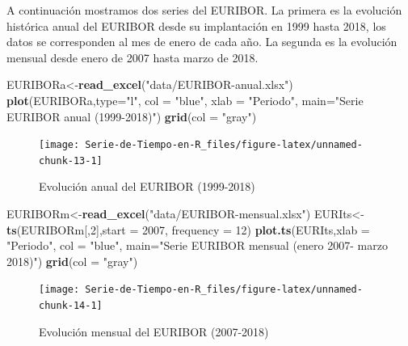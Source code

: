 \documentclass[12pt,]{krantz}
\makeatletter
\newenvironment{Shaded}{\begin{snugshade}}{\end{snugshade}}
\newcommand{\KeywordTok}[1]{\textcolor[rgb]{0.13,0.29,0.53}{\textbf{#1}}}
\newcommand{\DataTypeTok}[1]{\textcolor[rgb]{0.13,0.29,0.53}{#1}}
\newcommand{\DecValTok}[1]{\textcolor[rgb]{0.00,0.00,0.81}{#1}}
\newcommand{\StringTok}[1]{\textcolor[rgb]{0.31,0.60,0.02}{#1}}
\newcommand{\NormalTok}[1]{#1}
\newenvironment{kframe}{%
\medskip{}
\setlength{\fboxsep}{.8em}
 \def\at@end@of@kframe{}%
 \ifinner\ifhmode%
  \def\at@end@of@kframe{\end{minipage}}%
  \begin{minipage}{\columnwidth}%
 \fi\fi%
 \def\FrameCommand##1{\hskip\@totalleftmargin \hskip-\fboxsep
 \colorbox{shadecolor}{##1}\hskip-\fboxsep
     \hskip-\linewidth \hskip-\@totalleftmargin \hskip\columnwidth}%
 \MakeFramed {\advance\hsize-\width
   \@totalleftmargin\z@ \linewidth\hsize
   \@setminipage}}%
 {\par\unskip\endMakeFramed%
 \at@end@of@kframe}
\renewenvironment{Shaded}{\begin{kframe}}{\end{kframe}}
\theoremstyle{definition}
\theoremstyle{definition}
\theoremstyle{definition}
\theoremstyle{remark}
\makeatother
\begin{document}
A continuación mostramos dos series del EURIBOR. La primera es la
evolución histórica anual del EURIBOR desde su implantación en 1999
hasta 2018, los datos se corresponden al mes de enero de cada año. La
segunda es la evolución mensual desde enero de 2007 hasta marzo de 2018.

\begin{Shaded}
\begin{Highlighting}[]
\NormalTok{EURIBORa<-}\KeywordTok{read_excel}\NormalTok{(}\StringTok{"data/EURIBOR-anual.xlsx"}\NormalTok{)}
\KeywordTok{plot}\NormalTok{(EURIBORa,}\DataTypeTok{type=}\StringTok{"l"}\NormalTok{, }\DataTypeTok{col =} \StringTok{"blue"}\NormalTok{, }\DataTypeTok{xlab =} \StringTok{"Periodo"}\NormalTok{, }
     \DataTypeTok{main=}\StringTok{"Serie EURIBOR anual (1999-2018)"}\NormalTok{)}
\KeywordTok{grid}\NormalTok{(}\DataTypeTok{col =} \StringTok{"gray"}\NormalTok{)}
\end{Highlighting}
\end{Shaded}

\begin{figure}

{\centering \texttt{[image: Serie-de-Tiempo-en-R\_files/figure-latex/unnamed-chunk-13-1]} 

}

\caption{Evolución anual del EURIBOR (1999-2018)}\label{fig:unnamed-chunk-13}
\end{figure}

\begin{Shaded}
\begin{Highlighting}[]
\NormalTok{EURIBORm<-}\KeywordTok{read_excel}\NormalTok{(}\StringTok{"data/EURIBOR-mensual.xlsx"}\NormalTok{)}
\NormalTok{EURIts<-}\KeywordTok{ts}\NormalTok{(EURIBORm[,}\DecValTok{2}\NormalTok{],}\DataTypeTok{start =} \DecValTok{2007}\NormalTok{, }\DataTypeTok{frequency =} \DecValTok{12}\NormalTok{)}
\KeywordTok{plot.ts}\NormalTok{(EURIts,}\DataTypeTok{xlab =} \StringTok{"Periodo"}\NormalTok{, }\DataTypeTok{col =} \StringTok{"blue"}\NormalTok{, }
        \DataTypeTok{main=}\StringTok{"Serie EURIBOR mensual (enero 2007- marzo 2018)"}\NormalTok{)}
\KeywordTok{grid}\NormalTok{(}\DataTypeTok{col =} \StringTok{"gray"}\NormalTok{)}
\end{Highlighting}
\end{Shaded}

\begin{figure}

{\centering \texttt{[image: Serie-de-Tiempo-en-R\_files/figure-latex/unnamed-chunk-14-1]} 

}

\caption{Evolución mensual del EURIBOR (2007-2018)}\label{fig:unnamed-chunk-14}
\end{figure}
\end{document}
